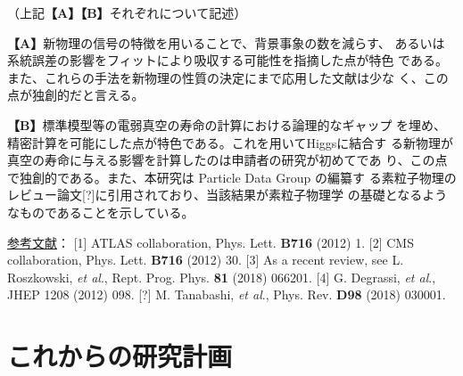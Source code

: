 \documentclass[11pt,a4paper,twoside,dvipdfmx]{jsarticle}   %
\newcommand{\研究課題名}{粒子加速器を用いた電弱相互作用を持つ新物理の探索}
\newcommand{\研究機関名}{東京大学}
\newcommand{\申請者氏名}{千草颯}
\newcommand{\研究代表者氏名}{\申請者氏名}
\newcommand{\研究期間の最終元号年度}{34}	%
\begin{document}
{（上記\textbf{【A】【B】}それぞれについて記述）

\vspace*{1mm}

\textbf{【A】}新物理の信号の特徴を用いることで、背景事象の数を減らす、
あるいは系統誤差の影響をフィットにより吸収する可能性を指摘した点が特色
である。また、これらの手法を新物理の性質の決定にまで応用した文献は少な
く、この点が独創的だと言える。

\textbf{【B】}標準模型等の電弱真空の寿命の計算における論理的なギャップ
を埋め、精密計算を可能にした点が特色である。これを用いてHiggsに結合す
る新物理が真空の寿命に与える影響を計算したのは申請者の研究が初めてであ
り、この点で独創的である。また、本研究は Particle Data Group の編纂す
る素粒子物理のレビュー論文[?]に引用されており、当該結果が素粒子物理学
の基礎となるようなものであることを示している。

\underline{参考文献}：
[1] ATLAS collaboration, Phys. Lett. \textbf{B716} (2012) 1.
[2] CMS collaboration, Phys. Lett. \textbf{B716} (2012) 30.
[3] As a recent review, see L. Roszkowski, \textit{et al}., Rept. Prog. Phys. \textbf{81} (2018) 066201.
[4] G. Degrassi, \textit{et al}., JHEP 1208 (2012) 098.
[?] M. Tanabashi, \textit{et al}., Phys. Rev. \textbf{D98} (2018) 030001.

}

\section{これからの研究計画}
\end{document}
